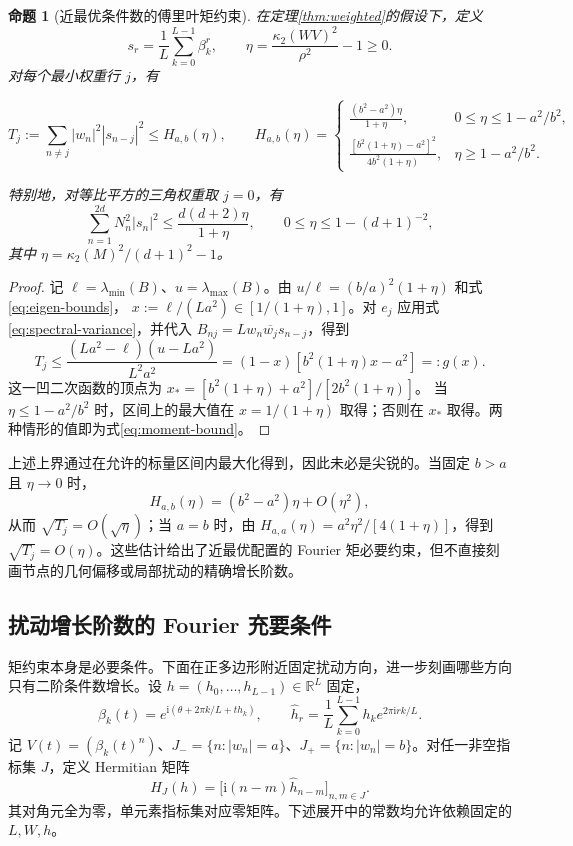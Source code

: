 \documentclass[UTF8,a4paper,zihao=-4,fontset=windows]{ctexart}
\theoremstyle{chinese}
\newtheorem{proposition}[theorem]{命题}
\numberwithin{equation}{section}
\newcommand{\cond}{\kappa_2}
\begin{document}
\begin{proposition}[近最优条件数的傅里叶矩约束]\label{prop:near}
在定理\ref{thm:weighted}的假设下，定义
\[
s_r=\frac1L\sum_{k=0}^{L-1}\beta_k^r,\qquad
\eta=\frac{\cond(WV)^2}{\rho^2}-1\ge0.
\]
对每个最小权重行 $j$，有

\begin{equation}\label{eq:moment-bound}
T_j:=\sum_{n\ne j}|w_n|^2|s_{n-j}|^2\le H_{a,b}(\eta),\qquad
H_{a,b}(\eta)=\begin{cases}
\displaystyle\frac{(b^2-a^2)\eta}{1+\eta},&0\le\eta\le1-a^2/b^2,\\[6pt]
\displaystyle\frac{[b^2(1+\eta)-a^2]^2}{4b^2(1+\eta)},&\eta\ge1-a^2/b^2.
\end{cases}
\end{equation}

特别地，对等比平方的三角权重取 $j=0$，有
\begin{equation}\label{eq:triangle-moment}
\sum_{n=1}^{2d}N_n^2|s_n|^2
\le\frac{d(d+2)\eta}{1+\eta},\qquad 0\le\eta\le1-(d+1)^{-2},
\end{equation}
其中 $\eta=\cond(M)^2/(d+1)^2-1$。
\end{proposition}
\begin{proof}
记 $\ell=\lambda_{\min}(B)$、$u=\lambda_{\max}(B)$。由 $u/\ell=(b/a)^2(1+\eta)$ 和式\eqref{eq:eigen-bounds}，
$x:=\ell/(La^2)\in[1/(1+\eta),1]$。对 $e_j$ 应用式\eqref{eq:spectral-variance}，并代入 $B_{nj}=Lw_n\overline{w_j}s_{n-j}$，得到
\[
T_j\le\frac{(La^2-\ell)(u-La^2)}{L^2a^2}
=(1-x)[b^2(1+\eta)x-a^2]=:g(x).
\]
这一凹二次函数的顶点为 $x_*=[b^2(1+\eta)+a^2]/[2b^2(1+\eta)]$。
当 $\eta\le1-a^2/b^2$ 时，区间上的最大值在 $x=1/(1+\eta)$ 取得；否则在 $x_*$ 取得。两种情形的值即为式\eqref{eq:moment-bound}。
\end{proof}

上述上界通过在允许的标量区间内最大化得到，因此未必是尖锐的。当固定 $b>a$ 且 $\eta\to0$ 时，
\[
H_{a,b}(\eta)=(b^2-a^2)\eta+O(\eta^2),
\]
从而 $\sqrt{T_j}=O(\sqrt{\eta})$；当 $a=b$ 时，由 $H_{a,a}(\eta)=a^2\eta^2/[4(1+\eta)]$，得到 $\sqrt{T_j}=O(\eta)$。这些估计给出了近最优配置的 Fourier 矩必要约束，但不直接刻画节点的几何偏移或局部扰动的精确增长阶数。

\subsection{扰动增长阶数的 Fourier 充要条件}
矩约束本身是必要条件。下面在正多边形附近固定扰动方向，进一步刻画哪些方向只有二阶条件数增长。设 $h=(h_0,\ldots,h_{L-1})\in\mathbb R^L$ 固定，
\begin{equation}\label{eq:direction-nodes}
\beta_k(t)=e^{\mathrm i(\theta+2\pi k/L+t h_k)},\qquad
\widehat h_r=\frac1L\sum_{k=0}^{L-1}h_k e^{2\pi\mathrm i rk/L}.
\end{equation}
记 $V(t)=(\beta_k(t)^n)$、$J_-=\{n:|w_n|=a\}$、$J_+=\{n:|w_n|=b\}$。对任一非空指标集 $J$，定义 Hermitian 矩阵
\[
H_J(h)=\bigl[\mathrm i(n-m)\widehat h_{n-m}\bigr]_{n,m\in J}.
\]
其对角元全为零，单元素指标集对应零矩阵。下述展开中的常数均允许依赖固定的 $L,W,h$。
\end{document}
